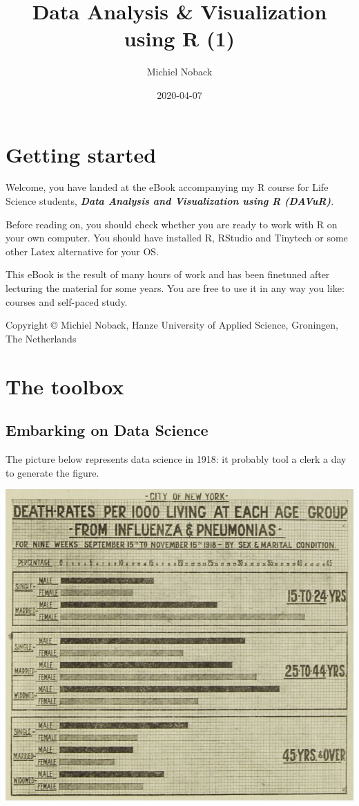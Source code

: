 \documentclass[]{book}
\title{Data Analysis \& Visualization using R (1)}
\author{Michiel Noback}
\date{2020-04-07}
\begin{document}
\maketitle

{
\setcounter{tocdepth}{1}
\tableofcontents
}
\hypertarget{getting-started}{%
\chapter{Getting started}\label{getting-started}}

Welcome, you have landed at the eBook accompanying my R course for Life Science students, \textbf{\emph{Data Analysis and Visualization using R (DAVuR)}}.

Before reading on, you should check whether you are ready to work with R on your own computer.
You should have installed R, RStudio and Tinytech or some other Latex alternative for your OS.

This eBook is the result of many hours of work and has been finetuned after lecturing the material for some years.
You are free to use it in any way you like: courses and self-paced study.

Copyright © Michiel Noback, Hanze University of Applied Science, Groningen, The Netherlands

\hypertarget{toolbox}{%
\chapter{The toolbox}\label{toolbox}}

\hypertarget{embarking-on-data-science}{%
\section{Embarking on Data Science}\label{embarking-on-data-science}}

The picture below represents data science in 1918: it probably tool a clerk a day to generate the figure.

\includegraphics{figures/influenza_1918_new_york.jpg}
\end{document}
